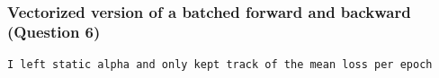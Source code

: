 \documentclass[11pt]{article}
\begin{document}
    \begin{center}
    \end{center}
    { \hspace*{\fill} \\}
    
    \hypertarget{vectorized-version-of-a-batched-forward-and-backward-question-6}{%
\subsubsection{Vectorized version of a batched forward and backward
(Question
6)}\label{vectorized-version-of-a-batched-forward-and-backward-question-6}}

\begin{verbatim}
I left static alpha and only kept track of the mean loss per epoch
\end{verbatim}
\end{document}
